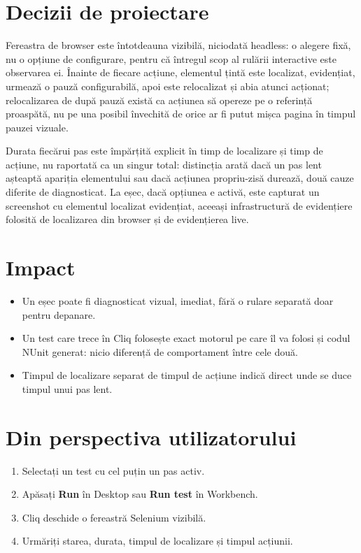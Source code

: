 \documentclass[12pt,a4paper]{report}
\newcommand{\UI}[1]{\textbf{#1}}
\begin{document}
\section{Decizii de proiectare}

Fereastra de browser este întotdeauna vizibilă, niciodată headless: o alegere fixă, nu o opțiune de configurare, pentru că întregul scop al rulării interactive este observarea ei. Înainte de fiecare acțiune, elementul țintă este localizat, evidențiat, urmează o pauză configurabilă, apoi este relocalizat și abia atunci acționat; relocalizarea de după pauză există ca acțiunea să opereze pe o referință proaspătă, nu pe una posibil învechită de orice ar fi putut mișca pagina în timpul pauzei vizuale.

Durata fiecărui pas este împărțită explicit în timp de localizare și timp de acțiune, nu raportată ca un singur total: distincția arată dacă un pas lent așteaptă apariția elementului sau dacă acțiunea propriu-zisă durează, două cauze diferite de diagnosticat. La eșec, dacă opțiunea e activă, este capturat un screenshot cu elementul localizat evidențiat, aceeași infrastructură de evidențiere folosită de localizarea din browser și de evidențierea live.

\section{Impact}

\begin{itemize}
  \item Un eșec poate fi diagnosticat vizual, imediat, fără o rulare separată doar pentru depanare.
  \item Un test care trece în Cliq folosește exact motorul pe care îl va folosi și codul NUnit generat: nicio diferență de comportament între cele două.
  \item Timpul de localizare separat de timpul de acțiune indică direct unde se duce timpul unui pas lent.
\end{itemize}

\section{Din perspectiva utilizatorului}

\begin{enumerate}
  \item Selectați un test cu cel puțin un pas activ.
  \item Apăsați \UI{Run} în Desktop sau \UI{Run test} în Workbench.
  \item Cliq deschide o fereastră Selenium vizibilă.
  \item Urmăriți starea, durata, timpul de localizare și timpul acțiunii.
\end{enumerate}
\end{document}
